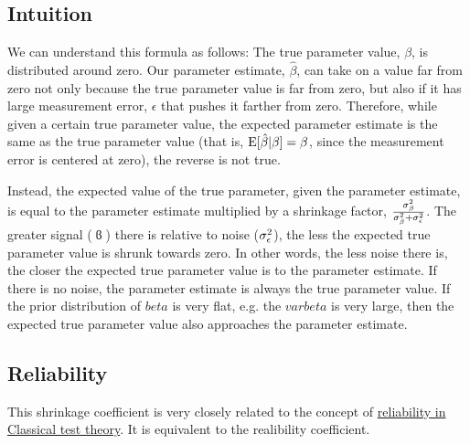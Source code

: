 \documentclass[12pt]{article}
\begin{document}
\subsection{Intuition}
We can understand this formula as follows:
The true parameter value, $\beta$, is distributed around zero.
Our parameter estimate, $\hat{\beta}$, can take on a value far from zero not only because the true parameter value is far from zero, but also if it has large measurement error, $\epsilon$ that pushes it farther from zero.
Therefore, while given a certain true parameter value, the expected parameter estimate is the same as the true parameter value (that is, $\mathrm{E}[\hat{\beta} | \beta] = \beta$, since the measurement error is centered at zero), the reverse is not true.

Instead, the expected value of the true parameter, given the parameter estimate, is equal to the parameter estimate multiplied by a shrinkage factor, $\frac{\sigma_{\beta}^2}{\sigma_{\beta}^2 + \sigma_{\epsilon}^2}$.
The greater signal ($\varbeta$) there is relative to noise ($\sigma_{\epsilon}^2$), the less the expected true parameter value is shrunk towards zero.
In other words, the less noise there is, the closer the expected true parameter value is to the parameter estimate.
If there is no noise, the parameter estimate is always the true parameter value.
If the prior distribution of $beta$ is very flat, e.g. the $varbeta$ is very large, then the expected true parameter value also approaches the parameter estimate.

\subsection{Reliability}

This shrinkage coefficient is very closely related to the concept of \href{https://en.wikipedia.org/wiki/Reliability_(statistics)#Classical_test_theory}{reliability in Classical test theory}.
It is equivalent to the realibility coefficient.
\end{document}
